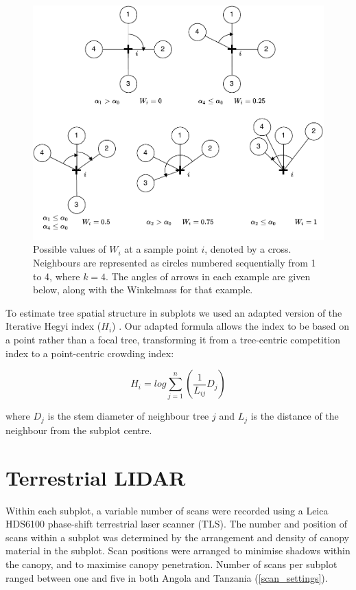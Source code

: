 \documentclass[11pt,a4paper]{article}
\begin{document}
\begin{figure}[H]
\centering
	\includegraphics[width=\textwidth]{winkelmass}
	\caption{Possible values of $W_{i}$ at a sample point $i$, denoted by a cross. Neighbours are represented as circles numbered sequentially from 1 to 4, where $k = 4$. The angles of arrows in each example are given below, along with the Winkelmass for that example.}
	\label{winkelmass}
\end{figure}

To estimate tree spatial structure in subplots we used an adapted version of the Iterative Hegyi index ($H_{i}$) \citep{Hegyi1974}. Our adapted formula allows the index to be based on a point rather than a focal tree, transforming it from a tree-centric competition index to a point-centric crowding index:

\begin{equation}
	H_{i} = log\sum_{j=1}^{n} (\frac{1}{L_{ij}} D_{j})
\end{equation}

where $D_{j}$ is the stem diameter of neighbour tree $j$ and $L_{j}$ is the distance of the neighbour from the subplot centre.


\section{Terrestrial LIDAR}

Within each subplot, a variable number of scans were recorded using a Leica HDS6100 phase-shift terrestrial laser scanner (TLS). The number and position of scans within a subplot was determined by the arrangement and density of canopy material in the subplot. Scan positions were arranged to minimise shadows within the canopy, and to maximise canopy penetration. Number of scans per subplot ranged between one and five in both Angola and Tanzania (\autoref{scan_settings}).
\end{document}
